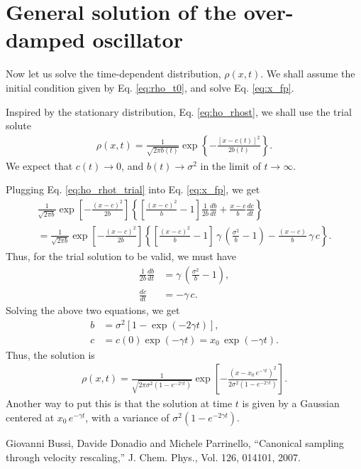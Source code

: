 \documentclass[11pt]{article}
\begin{document}
\section{General solution of the over-damped oscillator}



Now let us solve the time-dependent distribution, $\rho(x, t)$.
%
We shall assume the initial condition given by Eq. \eqref{eq:rho_t0},
%
and solve Eq. \eqref{eq:x_fp}.

Inspired by the stationary distribution, Eq. \eqref{eq:ho_rhost},
we shall use the trial solute
%
\begin{align}
\rho(x, t)
=
\frac{ 1 } { \sqrt{ 2 \pi b(t) } }
\exp \left\{
  -\frac{ [x - c(t)]^2 } { 2 b(t) }
\right\}.
\label{eq:ho_rhot_trial}
\end{align}
%
We expect that $c(t) \rightarrow 0$, and $b(t) \rightarrow \sigma^2$
in the limit of $t \rightarrow \infty$.

Plugging Eq. \eqref{eq:ho_rhot_trial} into Eq. \eqref{eq:x_fp},
we get
\begin{multline}
  \frac{ 1 } { \sqrt{ 2 \pi b } }
  \exp \left[
    - \frac{ (x - c)^2 } { 2 b }
  \right]
  \left\{
    \left[
      \frac { (x - c)^2 } { b } - 1
    \right]
    \frac{ 1 } { 2 b }
    \frac{ d b } { d t }
    +
    \frac { x - c } { b }
    \frac { d c } { d t }
  \right\} \\
=
  \frac{ 1 } { \sqrt{ 2 \pi b } }
  \exp \left[
    - \frac{ (x - c)^2 } { 2 b }
  \right]
  \left\{
    \left[
      \frac{ (x - c)^2 } { b } - 1
    \right]
    \, \gamma \,
    \left(\frac{ \sigma^2 } b - 1\right)
    -
    \frac{ (x - c) } { b } \, \gamma \, c
  \right\}.
\end{multline}
%
Thus, for the trial solution to be valid,
we must have
\begin{align*}
\frac{ 1 } { 2 b }
\frac{ d b } { d t }
&=
\gamma \,
\left(\frac{ \sigma^2 } b - 1\right),
\\
\frac { d c } { d t }
&=
-\gamma \, c.
\end{align*}
Solving the above two equations, we get
\begin{align*}
b &= \sigma^2 [1 - \exp( - 2 \gamma t)],
\\
c &= c(0) \exp(-\gamma t) = x_0 \, \exp(-\gamma t).
\end{align*}
%
Thus, the solution is
%
\begin{align}
\rho(x, t)
=
\frac{ 1 } { \sqrt{ 2 \pi \sigma^2 (1 - e^{-2\gamma t}) } }
\exp \left[
  -\frac{ ( x - x_0 \, e^{-\gamma t} )^2 } { 2 \sigma^2 (1 - e^{-2\gamma t}) }
\right].
\label{eq:ho_rhot}
\end{align}
Another way to put this is that
the solution at time $t$ is given by
a Gaussian centered at $x_0 \, e^{-\gamma t}$,
with a variance of $\sigma^2 (1 - e^{-2\gamma t})$.



\begin{thebibliography}{100}

  Giovanni Bussi, Davide Donadio and Michele Parrinello,
  ``Canonical sampling through velocity rescaling,''
  J. Chem. Phys., Vol. 126, 014101,
  2007.

\end{thebibliography}
\end{document}
